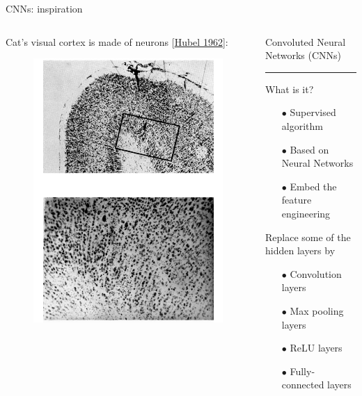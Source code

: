 \documentclass[8pt, table, aspectratio=169]{beamer}
\begin{document}
\begin{frame}{CNNs: inspiration}
	\begin{columns}[T] %
		\begin{column}{.5\textwidth}
			Cat's visual cortex is made of neurons [{\color{blue}\href{http://onlinelibrary.wiley.com/doi/10.1113/jphysiol.1962.sp006837/pdf}{Hubel 1962}}]:
			\begin{figure}
				\centering
				\includegraphics[width=0.65\linewidth]{figures/cat_visual_cortex_neurons.png}
			\end{figure}
		\end{column}%
		\begin{column}{.35\textwidth}
			Convoluted Neural Networks (CNNs)
			{\color{blue}\rule{\linewidth}{4pt}}
			What is it?
			\begin{itemize}
				\item[$\bullet$] Supervised algorithm
				\item[]
				\item[$\bullet$] Based on Neural Networks
				\item[]
				\item[$\bullet$] Embed the feature engineering
				\item[]
			\end{itemize}
			Replace some of the hidden layers by
			\begin{itemize}
				\item[$\bullet$] Convolution layers
				\item[$\bullet$] Max pooling layers
				\item[$\bullet$] ReLU layers
				\item[$\bullet$] Fully-connected layers
			\end{itemize}
		\end{column}%
	\end{columns}
	
\end{frame}
\end{document}

